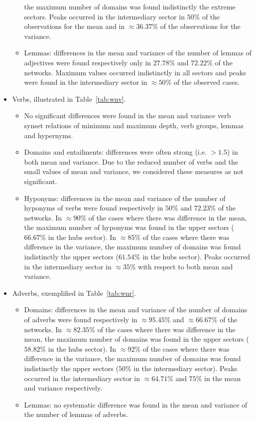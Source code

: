 \begin{itemize}
\begin{itemize}
				the maximum number of domains was found indistinctly the extreme sectors.
				Peaks occurred in the intermediary sector in $50\%$ of the observations for the mean
				and in $\approx 36.37\%$ of the observations for the variance.
			\item Lemmas:
				differences in the mean and variance of the number of lemmas of adjectives were found respectively only in $27.78\%$ and $72.22\%$ of the networks.
				Maximum values occurred indistinctly in all sectors and peaks were found in the intermediary sector in $\approx 50\%$ of the observed cases.

\FloatBarrier
		\end{itemize}
	\item Verbs, illustrated in Table~\ref{tab:wnv}.
		\begin{itemize}
			\item No significant differences were found in the mean and variance verb synset relations of minimum and maximum depth, verb groups, lemmas and hypernyms.
			\item Domains and entailments:
				differences were often strong (i.e. $>1.5$) in both mean and variance.
				Due to the reduced number of verbs and the small values of mean and variance,
				we considered these measures as not significant.
			\item Hyponyms:
				differences in the mean and variance of the number of hyponyms of verbs were found respectively in $50\%$ and $72.23\%$ of the networks.
				In $\approx 90\%$ of the cases where there was difference in the mean, 
				the maximum number of hyponyms was found in the upper sectors ($66.67\%$ in the hubs sector).
				In $\approx 85\%$ of the cases where there was difference in the variance, 
				the maximum number of domains was found indistinctly the upper sectors ($61.54\%$ in the hubs sector).
				Peaks occurred in the intermediary sector in $\approx 35\%$ with respect to both mean and variance.

\FloatBarrier
		\end{itemize}
	\item Adverbs, exemplified in Table~\ref{tab:wnr}.
		\begin{itemize}
			\item Domains:
				differences in the mean and variance of the number of domains of adverbs were found respectively in $\approx 95.45\%$ and $\approx 66.67\%$ of the networks.
				In $\approx 82.35\%$ of the cases where there was difference in the mean, 
				the maximum number of domains was found in the upper sectors ($58.82\%$ in the hubs sector).
				In $\approx 92\%$ of the cases where there was difference in the variance, 
				the maximum number of domains was found indistinctly the upper sectors ($50\%$ in the intermediary sector).
				Peaks occurred in the intermediary sector in $\approx 64.71\%$ and $75\%$ in the mean and variance respectively.
			\item Lemmas:
				no systematic difference was found in the mean and variance of the number of lemmas of adverbs.

\FloatBarrier
		\end{itemize}
\end{itemize}

